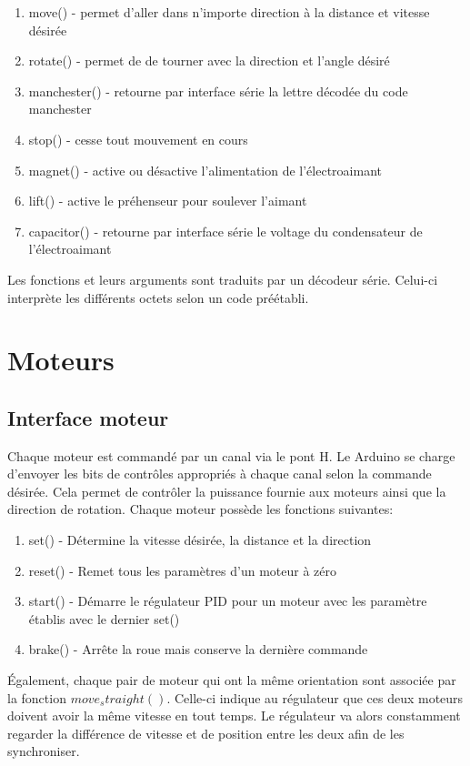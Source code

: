 \begin{enumerate}

\item move() - permet d’aller dans n’importe direction à la distance et vitesse désirée
\item rotate() -  permet de de tourner avec la direction et l’angle désiré
\item manchester() - retourne par interface série la lettre décodée du code manchester
\item stop() - cesse tout mouvement en cours
\item magnet() - active ou désactive l’alimentation de l’électroaimant
\item lift() - active le préhenseur pour soulever l’aimant
\item capacitor() - retourne par interface série le voltage du condensateur de l’électroaimant
\end{enumerate}

Les fonctions et leurs arguments sont traduits par un décodeur série. Celui-ci interprète les différents octets selon un code préétabli.

\section{Moteurs}

\subsection{Interface moteur}

Chaque moteur est commandé par un canal via le pont H. Le Arduino se charge d’envoyer les bits de contrôles appropriés à chaque canal selon la commande désirée. Cela permet de contrôler la puissance fournie aux moteurs ainsi que la direction de rotation. Chaque moteur possède les fonctions suivantes:

\begin{enumerate}
\item set() - Détermine la vitesse désirée, la distance et la direction
\item reset() - Remet tous les paramètres d’un moteur à zéro
\item start() - Démarre le régulateur PID pour un moteur avec les paramètre établis avec le dernier set()
\item brake() - Arrête la roue mais conserve la dernière commande
\end{enumerate}

Également, chaque pair de moteur qui ont la même orientation sont associée par la fonction $move_straight()$. Celle-ci indique au régulateur que ces deux moteurs doivent avoir la même vitesse en tout temps. Le régulateur va alors constamment regarder la différence de vitesse et de position entre les deux afin de les synchroniser.


